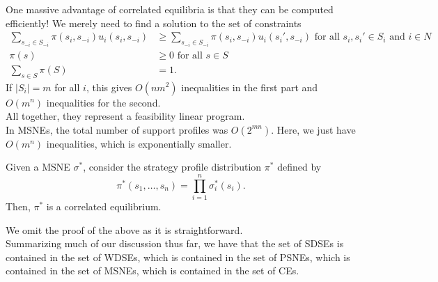 	One massive advantage of correlated equilibria is that they can be computed efficiently! We merely need to find a solution to the set of constraints
	\begin{align*}
		\sum_{s_{-i} \in S_{-i}} \pi(s_i,s_{-i}) u_i(s_i,s_{-i}) &\ge \sum_{s_{-i} \in S_{-i}} \pi(s_i,s_{-i}) u_i(s_i',s_{-i}) \text{ for all $s_i,s_i' \in S_i$ and $i \in N$} \\
		\pi(s) &\ge 0 \text{ for all $s \in S$} \\
		\sum_{s \in S} \pi(S) &= 1.
	\end{align*}
	If $|S_i| = m$ for all $i$, this gives $O(nm^2)$ inequalities in the first part and $O(m^n)$ inequalities for the second.\\
	All together, they represent a feasibility linear program.\\

	In MSNEs, the total number of support profiles was $O(2^{mn})$. Here, we just have $O(m^n)$ inequalities, which is exponentially smaller.\\

	\begin{ftheo}
		Given a MSNE $\sigma^*$, consider the strategy profile distribution $\pi^*$ defined by
		\[ \pi^*(s_1,\ldots,s_n) = \prod_{i=1}^n \sigma_i^*(s_i). \]
		Then, $\pi^*$ is a correlated equilibrium.
	\end{ftheo}

	We omit the proof of the above as it is straightforward.\\
	Summarizing much of our discussion thus far, we have that the set of SDSEs is contained in the set of WDSEs, which is contained in the set of PSNEs, which is contained in the set of MSNEs, which is contained in the set of CEs.

\clearpage